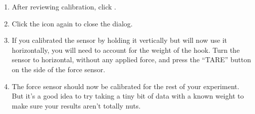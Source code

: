 \begin{enumerate}
\item After reviewing calibration, click .

\item Click the  icon again to close the dialog. 

\item If you calibrated the sensor by holding it vertically but will now use it horizontally, you will need to account for the weight of the hook.  Turn the sensor to horizontal, without any applied force, and press the ``TARE'' button on the side of the force sensor.

\item The force sensor should now be calibrated for the rest of your experiment.  But it's a good idea to try taking a tiny bit of data with a known weight to make sure your results aren't totally nuts.

\end{enumerate}

